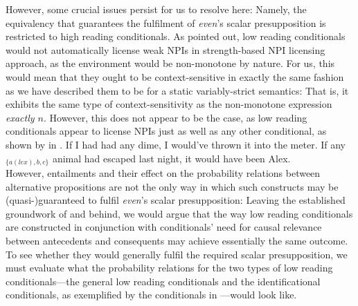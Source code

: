 However, some crucial issues persist for us to resolve here: Namely, the equivalency that guarantees the fulfilment of \textit{even}'s scalar presupposition is restricted to high reading conditionals. As \textcite{Walker2015} pointed out, low reading conditionals would not automatically license weak NPIs in  strength-based NPI licensing approach, as the environment would be non-monotone by nature. For us, this would mean that they ought to be context-sensitive in exactly the same fashion as we have described them to be for a static variably-strict semantics: That is, it exhibits the same type of context-sensitivity as the non-monotone expression \textit{exactly $n$}. However, this does not appear to be the case, as low reading conditionals appear to license NPIs just as well as any other conditional, as shown by \textcite{Walker2015} in .%
\pex\label{ex:lowreading-npi}
\a If I had had any dime, I would've thrown it into the meter.\label{ex:lowreading-npi1}
\a If any$_{\{a(lex),b,c\}}$ animal had escaped last night, it would have been Alex.\\\emptyfill\parencite[adapted from][p.~300]{Walker2015}\label{ex:lowreading-npi2}
\xe
However, entailments and their effect on the probability relations between alternative propositions are not the only way in which such constructs may be (quasi-)guaranteed to fulfil \textit{even}'s scalar presupposition: Leaving the established groundwork of \textcite{vanRooij2006} and \textcite{Walker2015} behind, we would argue that the way low reading conditionals are constructed in conjunction with conditionals' need for causal relevance between antecedents and consequents may achieve essentially the same outcome. To see whether they would generally fulfil the required scalar presupposition, we must evaluate what the probability relations for the two types of low reading conditionals---the general low reading conditionals and the identificational conditionals, as exemplified by the conditionals in ---would look like.

